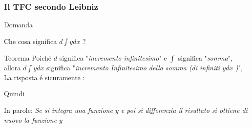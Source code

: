\begin{frame}
    \frametitle{Il TFC secondo Leibniz}
    \begin{alertblock}{Domanda}
    \begin{center}
        \fontsize{15}{17.2}\selectfont
        Che cosa significa $d$$\int$$ydx$ ?
    \end{center}
    \end{alertblock}
    \begin{block}{Teorema}
        Poiché $d$ significa "\textit{incremento infinitesimo}" e $\int$
        significa "\textit{somma}", allora $d$$\int$$ydx$ significa
        "\textit{incremento Infinitesimo della somma (di infiniti $ydx$} \textit{)}",
        La risposta é sicuramente :
        \begin{center}
        \scalebox{2}{%
                    $d$$\int$$ydx = ydx$%
                    }
        \end{center}
        Quindi
        \begin{center}
        \end{center}
        In parole: \textit{Se si integra una funzione $y$ e poi si 
        differenzia il risultato si ottiene di nuovo la funzione $y$
        }
    \end{block}
\end{frame}